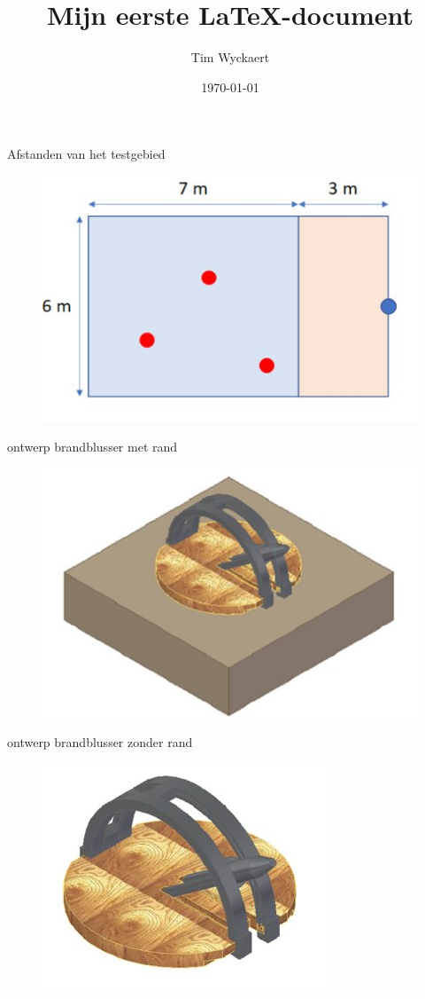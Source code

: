 \documentclass{kulakarticle}
\title{Mijn eerste \LaTeX-document}
\author{Tim Wyckaert}
\date{\today}
\begin{document}
	
	Afstanden van het testgebied 
	\begin{figure}
		\centering
		\includegraphics[width=.62\textwidth]{afstanden}
	\end{figure}

	ontwerp brandblusser met rand
	\begin{figure}
		\centering
		\includegraphics[width=.62\textwidth]{bompakanon}
	\end{figure}

	ontwerp brandblusser zonder rand
	\begin{figure}
		\centering
		\includegraphics[width=.62\textwidth]{bompakanon_2}
	\end{figure}
\end{document}
